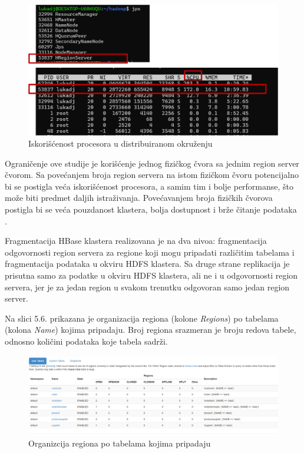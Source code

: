 \documentclass[12pt,oneside]{memoir}
\begin{document}
\begin{figure}[!ht]
  \centering
  \includegraphics[width=1\textwidth]{distribuirano-cpu.png}
  \caption{Iskorišćenost procesora u distribuiranom okruženju}
  \label{fig:grafikon}
\end{figure}

\pagebreak 
Ograničenje ove studije je korišćenje jednog fizičkog čvora sa jednim region server čvorom. Sa povećanjem broja region servera na istom fizičkom čvoru potencijalno bi se postigla veća iskorišćenost procesora, a samim tim i bolje performanse, što može biti predmet daljih istraživanja. Povećavanjem broja fizičkih čvorova postigla bi se veća pouzdanost klastera, bolja dostupnost i brže čitanje podataka \cite{ColumnarOriented}.  

Fragmentacija HBase klastera realizovana je na dva nivoa:  fragmentacija odgovornosti region servera za regione koji mogu pripadati različitim tabelama i fragmentacija podataka u okviru HDFS klastera. Sa druge strane replikacija je prisutna samo za podatke u okviru HDFS klastera, ali ne i u odgovornosti region servera, jer je za jedan region u svakom trenutku odgovoran samo jedan region server.

Na slici 5.6. prikazana  je organizacija regiona (kolone \textit{Regions}) po tabelama (kolona \textit{Name}) kojima pripadaju. Broj regiona srazmeran je broju redova tabele, odnosno količini podataka koje tabela sadrži. 

\begin{figure}[!ht]
  \centering
  \includegraphics[width=1\textwidth]{master-dist.png}
  \caption{Organizcija regiona po tabelama kojima pripadaju}
  \label{fig:grafikon}
\end{figure}
\end{document}
